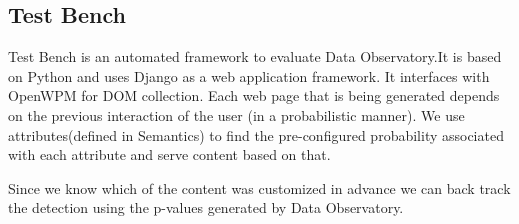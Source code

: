 \documentclass[fleqn,12pt]{SelfArx} %
\begin{document}
\subsection{Test Bench}
Test Bench is an automated framework to evaluate Data Observatory.It is based on Python and uses Django as a web application framework. It interfaces with OpenWPM for DOM collection. Each web page that is being generated depends on the previous interaction of the user (in a probabilistic manner). We use attributes(defined in Semantics) to find the pre-configured probability associated with each attribute and serve content based on that.\par
Since we know which of the content was customized in advance we can back track the detection using the p-values generated by Data Observatory.  


\end{document}
